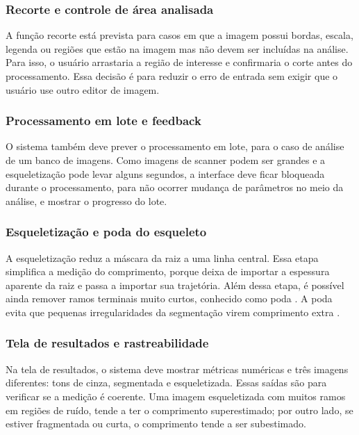 \documentclass[12pt]{article}
\begin{document}
\subsubsection{Recorte e controle de área analisada}

A função recorte está prevista para casos em que a imagem possui bordas, escala, legenda ou regiões que estão na imagem mas não devem ser incluídas na análise. Para isso, o usuário arrastaria a região de interesse e confirmaria o corte antes do processamento. Essa decisão é para reduzir o erro de entrada sem exigir que o usuário use outro editor de imagem.

\subsubsection{Processamento em lote e feedback}

O sistema também deve prever o processamento em lote, para o caso de análise de um banco de imagens. Como imagens de scanner podem ser grandes e a esqueletização pode levar alguns segundos, a interface deve ficar bloqueada durante o processamento, para não ocorrer mudança de parâmetros no meio da análise, e mostrar o progresso do lote.

\subsubsection{Esqueletização e poda do esqueleto}

A esqueletização reduz a máscara da raiz a uma linha central. Essa etapa simplifica a medição do comprimento, porque deixa de importar a espessura aparente da raiz e passa a importar sua trajetória. Além dessa etapa, é possível ainda remover ramos terminais muito curtos, conhecido como poda \cite{vanderwalt2014skimage}. A poda evita que pequenas irregularidades da segmentação virem comprimento extra \cite{gonzalez2008digital}. 

\subsubsection{Tela de resultados e rastreabilidade}

Na tela de resultados, o sistema deve mostrar métricas numéricas e três imagens diferentes: tons de cinza, segmentada e esqueletizada. Essas saídas são para verificar se a medição é coerente. Uma imagem esqueletizada com muitos ramos em regiões de ruído, tende a ter o comprimento superestimado; por outro lado, se estiver fragmentada ou curta, o comprimento tende a ser subestimado.
\end{document}
